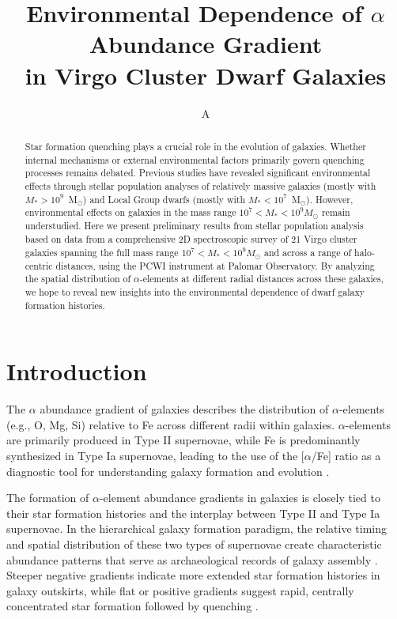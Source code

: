 \documentclass[linenumbers,trackchanges,twocolumn]{aastex631}
\begin{document}
\title{Environmental Dependence of $\alpha$ Abundance Gradient\\ in Virgo Cluster Dwarf Galaxies}

\author[0009-0002-8135-7011]{A}

\begin{abstract}
Star formation quenching plays a crucial role in the evolution of galaxies. Whether internal mechanisms or external environmental factors primarily govern quenching processes remains debated. Previous studies have revealed significant environmental effects through stellar population analyses of relatively massive galaxies (mostly with $M_*>10^9$~M$_{\odot}$) and Local Group dwarfs (mostly with $M_*<10^7$~M$_{\odot}$). However, environmental effects on galaxies in the mass range $10^7 < M_* < 10^9 M_{\odot}$ remain understudied. Here we present preliminary results from stellar population analysis based on data from a comprehensive 2D spectroscopic survey of 21 Virgo cluster galaxies spanning the full mass range $10^7 < M_* < 10^9 M_{\odot}$ and across a range of halo-centric distances, using the PCWI instrument at Palomar Observatory. By analyzing the spatial distribution of $\alpha$-elements at different radial distances across these galaxies, we hope to reveal new insights into the environmental dependence of dwarf galaxy formation histories.
\end{abstract}


\section{Introduction}

The $\alpha$ abundance gradient of galaxies describes the distribution of $\alpha$-elements (e.g., O, Mg, Si) relative to Fe across different radii within galaxies. $\alpha$-elements are primarily produced in Type II supernovae, while Fe is predominantly synthesized in Type Ia supernovae, leading to the use of the [$\alpha$/Fe] ratio as a diagnostic tool for understanding galaxy formation and evolution \citep{burbidge1957synthesis, tinsley1979chemical}.

The formation of $\alpha$-element abundance gradients in galaxies is closely tied to their star formation histories and the interplay between Type II and Type Ia supernovae. In the hierarchical galaxy formation paradigm, the relative timing and spatial distribution of these two types of supernovae create characteristic abundance patterns that serve as archaeological records of galaxy assembly \citep{Matteucci1986, Thomas2005}. Steeper negative gradients indicate more extended star formation histories in galaxy outskirts, while flat or positive gradients suggest rapid, centrally concentrated star formation followed by quenching \citep{Kobayashi2004}.
\end{document}
